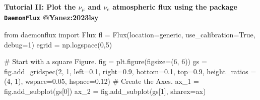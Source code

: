 \documentclass[
  letterpaper,
  DIV=11,
  numbers=noendperiod]{scrreprt}
\newenvironment{Shaded}{\begin{snugshade}}{\end{snugshade}}
\newcommand{\CommentTok}[1]{\textcolor[rgb]{0.37,0.37,0.37}{#1}}
\newcommand{\DecValTok}[1]{\textcolor[rgb]{0.68,0.00,0.00}{#1}}
\newcommand{\FloatTok}[1]{\textcolor[rgb]{0.68,0.00,0.00}{#1}}
\newcommand{\ImportTok}[1]{\textcolor[rgb]{0.00,0.46,0.62}{#1}}
\newcommand{\NormalTok}[1]{\textcolor[rgb]{0.00,0.23,0.31}{#1}}
\newcommand{\OperatorTok}[1]{\textcolor[rgb]{0.37,0.37,0.37}{#1}}
\newcommand{\StringTok}[1]{\textcolor[rgb]{0.13,0.47,0.30}{#1}}
\newcommand{\VariableTok}[1]{\textcolor[rgb]{0.07,0.07,0.07}{#1}}
\begin{document}
\begin{tcolorbox}[enhanced jigsaw, toprule=.15mm, colframe=quarto-callout-color-frame, bottomrule=.15mm, leftrule=.75mm, left=2mm, breakable, rightrule=.15mm, arc=.35mm, opacityback=0, colback=white]

\vspace{-3mm}\textbf{Tutorial II: Plot the \(\nu_\mu\) and \(\nu_e\) atmospheric flux using
the package \texttt{DaemonFlux} @Yanez:2023lsy}\vspace{3mm}

\begin{Shaded}
\begin{Highlighting}[]
\ImportTok{from}\NormalTok{ daemonflux }\ImportTok{import}\NormalTok{ Flux}
\NormalTok{fl }\OperatorTok{=}\NormalTok{ Flux(location}\OperatorTok{=}\StringTok{\textquotesingle{}generic\textquotesingle{}}\NormalTok{, use\_calibration}\OperatorTok{=}\VariableTok{True}\NormalTok{, debug}\OperatorTok{=}\DecValTok{1}\NormalTok{)}
\NormalTok{egrid }\OperatorTok{=}\NormalTok{ np.logspace(}\DecValTok{0}\NormalTok{,}\DecValTok{5}\NormalTok{)}

\CommentTok{\# Start with a square Figure.}
\NormalTok{fig }\OperatorTok{=}\NormalTok{ plt.figure(figsize}\OperatorTok{=}\NormalTok{(}\DecValTok{6}\NormalTok{, }\DecValTok{6}\NormalTok{))}
\NormalTok{gs }\OperatorTok{=}\NormalTok{ fig.add\_gridspec(}\DecValTok{2}\NormalTok{, }\DecValTok{1}\NormalTok{, }
\NormalTok{                      left}\OperatorTok{=}\FloatTok{0.1}\NormalTok{, right}\OperatorTok{=}\FloatTok{0.9}\NormalTok{, bottom}\OperatorTok{=}\FloatTok{0.1}\NormalTok{, top}\OperatorTok{=}\FloatTok{0.9}\NormalTok{,}
\NormalTok{                      height\_ratios }\OperatorTok{=}\NormalTok{ (}\DecValTok{4}\NormalTok{, }\DecValTok{1}\NormalTok{), wspace}\OperatorTok{=}\FloatTok{0.05}\NormalTok{, hspace}\OperatorTok{=}\FloatTok{0.12}\NormalTok{)}
\CommentTok{\# Create the Axes.}
\NormalTok{ax\_1 }\OperatorTok{=}\NormalTok{ fig.add\_subplot(gs[}\DecValTok{0}\NormalTok{])}
\NormalTok{ax\_2 }\OperatorTok{=}\NormalTok{ fig.add\_subplot(gs[}\DecValTok{1}\NormalTok{], sharex}\OperatorTok{=}\NormalTok{ax)}


\end{Highlighting}
\end{Shaded}
\end{tcolorbox}
\end{document}
